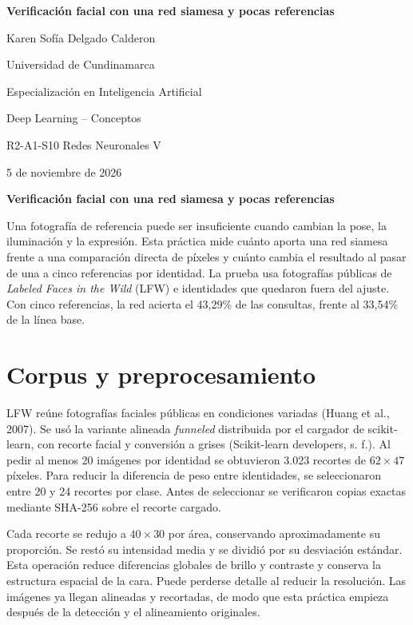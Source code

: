 \documentclass[12pt,letterpaper]{article}
\newcommand{\tituloinforme}{Verificación facial con una red siamesa y pocas referencias}
\begin{document}
\begin{titlepage}\thispagestyle{fancy}
\begin{center}\vspace*{1.35in}
\textbf{\tituloinforme}\par\vspace{\baselineskip}
Karen Sofía Delgado Calderon\par
Universidad de Cundinamarca\par
Especialización en Inteligencia Artificial\par
Deep Learning -- Conceptos\par
R2-A1-S10 Redes Neuronales V\par
5 de noviembre de 2026
\end{center}
\end{titlepage}
\setcounter{page}{2}
\begin{center}\textbf{\tituloinforme}\end{center}

Una fotografía de referencia puede ser insuficiente cuando cambian la pose, la iluminación y la expresión. Esta práctica mide cuánto aporta una red siamesa frente a una comparación directa de píxeles y cuánto cambia el resultado al pasar de una a cinco referencias por identidad. La prueba usa fotografías públicas de \textit{Labeled Faces in the Wild} (LFW) e identidades que quedaron fuera del ajuste. Con cinco referencias, la red acierta el 43,29\% de las consultas, frente al 33,54\% de la línea base.

\section{Corpus y preprocesamiento}
LFW reúne fotografías faciales públicas en condiciones variadas (Huang et al., 2007). Se usó la variante alineada \textit{funneled} distribuida por el cargador de scikit-learn, con recorte facial y conversión a grises (Scikit-learn developers, s. f.). Al pedir al menos 20 imágenes por identidad se obtuvieron 3.023 recortes de $62\times47$ píxeles. Para reducir la diferencia de peso entre identidades, se seleccionaron entre 20 y 24 recortes por clase. Antes de seleccionar se verificaron copias exactas mediante SHA-256 sobre el recorte cargado.

Cada recorte se redujo a $40\times30$ por área, conservando aproximadamente su proporción. Se restó su intensidad media y se dividió por su desviación estándar. Esta operación reduce diferencias globales de brillo y contraste y conserva la estructura espacial de la cara. Puede perderse detalle al reducir la resolución. Las imágenes ya llegan alineadas y recortadas, de modo que esta práctica empieza después de la detección y el alineamiento originales.
\end{document}
